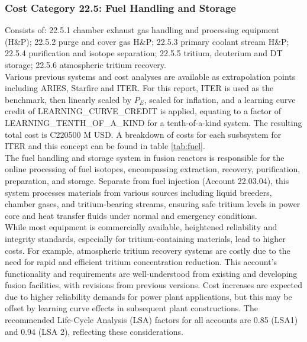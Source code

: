 
\subsubsection{Cost Category 22.5: Fuel Handling and Storage}

Consists of: 22.5.1 chamber exhaust gas handling and processing equipment (H\&P); 22.5.2 purge and cover gas H\&P; 22.5.3 primary coolant stream H\&P; 22.5.4 purification and isotope separation; 22.5.5 tritium, deuterium and DT storage; 22.5.6 atmospheric tritium recovery.\\

Various previous systems and cost analyses are available as extrapolation points including ARIES, Starfire and ITER. For this report, ITER is used as the benchmark, then linearly scaled by $P_E$, scaled for inflation, and a learning curve credit of LEARNING_CURVE_CREDIT is applied, equating to a factor of LEARNING_TENTH_OF_A_KIND for a tenth-of-a-kind system. The resulting total cost is C220500 M USD. A breakdown of costs for each susbsystem for ITER and this concept can be found in table \ref{tab:fuel}.\\

The fuel handling and storage system in fusion reactors is responsible for the online processing of fuel isotopes, encompassing extraction, recovery, purification, preparation, and storage. Separate from fuel injection (Account 22.03.04), this system processes materials from various sources including liquid breeders, chamber gases, and tritium-bearing streams, ensuring safe tritium levels in power core and heat transfer fluids under normal and emergency conditions.\\

While most equipment is commercially available, heightened reliability and integrity standards, especially for tritium-containing materials, lead to higher costs. For example, atmospheric tritium recovery systems are costly due to the need for rapid and efficient tritium concentration reduction. This account's functionality and requirements are well-understood from existing and developing fusion facilities, with revisions from previous versions. Cost increases are expected due to higher reliability demands for power plant applications, but this may be offset by learning curve effects in subsequent plant constructions. The recommended Life-Cycle Analysis (LSA) factors for all accounts are 0.85 (LSA1) and 0.94 (LSA 2), reflecting these considerations.


